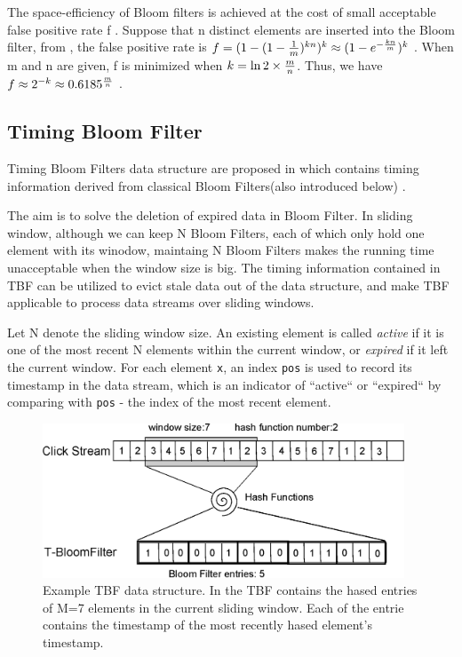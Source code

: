 \documentclass[runningheads,report]{llncs}
\begin{document}
The space-efficiency of Bloom filters is achieved at the cost of small acceptable
false positive rate f . Suppose that n distinct elements are
inserted into the Bloom filter, from \cite{DBLP:conf/sigcomm/FanCAB98}, the false positive
rate is $f = {(1 - {(1 - {1 \over m})^{kn}})^k} \approx {(1 - {e^{ - {{kn} \over m}}})^k}$ . When m and n are given, f is minimized when $k = \ln 2 \times {m \over n}$. Thus,
we have $f \approx {2^{ - k}} \approx {0.6185^{{m \over n}}}$ \cite{DBLP:conf/icdcs/ZhangG08}.

\subsection{Timing Bloom Filter}


Timing Bloom Filters data structure are proposed in \cite{DBLP:conf/icdcs/ZhangG08} which contains timing information derived from classical Bloom Filters(also introduced below)\cite{DBLP:journals/cacm/Bloom70} . 


The aim is to solve the deletion of expired data in Bloom Filter. In sliding window, although we can keep N Bloom Filters, each of which only hold one element with its winodow, maintaing N Bloom Filters makes the running time unacceptable when the window size is big. The timing information contained in TBF can be utilized to evict stale data out of the data structure, and make TBF applicable to process data streams over sliding windows.


Let N denote the sliding window size. An existing element is called \textit{active} if it is one of the most recent N elements within the current window, or \textit{expired} if it left the current window. For each element \texttt{x}, an index \texttt{pos} is used to record its timestamp in the data stream, which is an indicator of ``active`` or ``expired`` by comparing with \texttt{pos} - the index of the most recent element\cite{DBLP:conf/icdcs/ZhangG08}.


\begin{figure}
\centering
\includegraphics[height=4.6cm]{pic/TBFnew}
\caption{Example TBF data structure. In the TBF contains the hased entries of M=7 elements in the current sliding window. Each of the entrie contains the timestamp of the most recently hased element's timestamp.}
\label{fig:example}
\end{figure}
\end{document}
